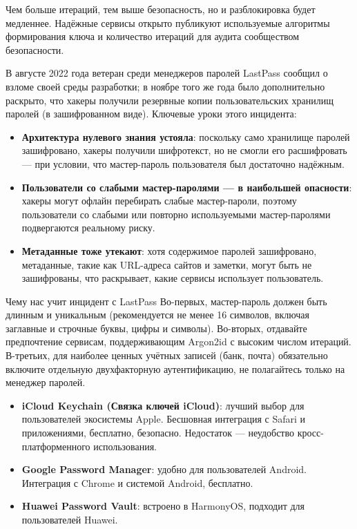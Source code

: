 Чем больше итераций, тем выше безопасность, но и разблокировка будет медленнее. Надёжные сервисы открыто публикуют используемые алгоритмы формирования ключа и количество итераций для аудита сообществом безопасности.


В августе 2022 года ветеран среди менеджеров паролей LastPass сообщил о взломе своей среды разработки; в ноябре того же года было дополнительно раскрыто, что хакеры получили резервные копии пользовательских хранилищ паролей (в зашифрованном виде). Ключевые уроки этого инцидента:

\begin{itemize}
  \item \textbf{Архитектура нулевого знания устояла}: поскольку само хранилище паролей зашифровано, хакеры получили шифротекст, но не смогли его расшифровать — при условии, что мастер-пароль пользователя был достаточно надёжным.
  \item \textbf{Пользователи со слабыми мастер-паролями — в наибольшей опасности}: хакеры могут офлайн перебирать слабые мастер-пароли, поэтому пользователи со слабыми или повторно используемыми мастер-паролями подвергаются реальному риску.
  \item \textbf{Метаданные тоже утекают}: хотя содержимое паролей зашифровано, метаданные, такие как URL-адреса сайтов и заметки, могут быть не зашифрованы, что раскрывает, какие сервисы использует пользователь.
\end{itemize}

\begin{tcbwarn}{Чему нас учит инцидент с LastPass}
Во-первых, мастер-пароль должен быть длинным и уникальным (рекомендуется не менее 16 символов, включая заглавные и строчные буквы, цифры и символы). Во-вторых, отдавайте предпочтение сервисам, поддерживающим Argon2id с высоким числом итераций. В-третьих, для наиболее ценных учётных записей (банк, почта) обязательно включите отдельную двухфакторную аутентификацию, не полагайтесь только на менеджер паролей.

\end{tcbwarn}



\begin{itemize}
  \item \textbf{iCloud Keychain (Связка ключей iCloud)}: лучший выбор для пользователей экосистемы Apple. Бесшовная интеграция с Safari и приложениями, бесплатно, безопасно. Недостаток — неудобство кросс-платформенного использования.
  \item \textbf{Google Password Manager}: удобно для пользователей Android. Интеграция с Chrome и системой Android, бесплатно.
  \item \textbf{Huawei Password Vault}: встроено в HarmonyOS, подходит для пользователей Huawei.
\end{itemize}

